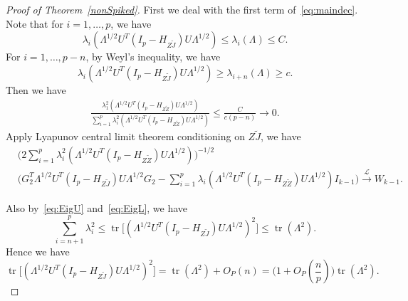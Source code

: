 \documentclass[review]{elsarticle}
\DeclareMathOperator{\mytr}{tr}
\theoremstyle{plain}
\theoremstyle{definition}
\theoremstyle{remark}
\begin{document}
\begin{proof}[\textrm{Proof of Theorem~\ref{nonSpiked}}]
    First we deal with the first term of~\eqref{eq:maindec}.
    Note that for $i=1,\ldots, p$, we have 
    \begin{equation}\label{eq:EigU}
    \lambda_i (\Lambda^{1/2}U^T (I_p-H_{Z\tilde{J}})U\Lambda^{1/2})\leq
    \lambda_i (\Lambda)\leq
    C.
    \end{equation}
    For $i=1,\ldots, p-n$, by Weyl's inequality, we have
    \begin{equation}\label{eq:EigL}
    \lambda_i (\Lambda^{1/2}U^T (I_p-H_{Z\tilde{J}})U\Lambda^{1/2})\geq
    \lambda_{i+n} (\Lambda)
    \geq c.
    \end{equation}
Then we have
    $$
    \begin{aligned}
    \frac{\lambda_1^2(\Lambda^{1/2}U^T(I_p-H_{Z\tilde{Z}})U\Lambda^{1/2})}{\sum_{i=1}^p \lambda_i^2(\Lambda^{1/2}U^T(I_p-H_{Z\tilde{Z}})U\Lambda^{1/2})}
    \leq
        \frac{C}{c(p-n)}\to 0.
    \end{aligned}
    $$
    Apply Lyapunov central limit theorem conditioning on $Z\tilde{J}$, we have
    $$
    \begin{aligned}
        &\Big( 2\sum_{i=1}^p \lambda_i^2(\Lambda^{1/2}U^T(I_p-H_{Z\tilde{Z}})U\Lambda^{1/2})\Big)^{-1/2}\\
        &{\Big( G_2^T \Lambda^{1/2}U^T (I_p-H_{Z\tilde{J}})U\Lambda^{1/2}G_2-\sum_{i=1}^p \lambda_i(\Lambda^{1/2}U^T(I_p-H_{Z\tilde{Z}})U\Lambda^{1/2})I_{k-1}\Big)}
    \xrightarrow{\mathcal{L}} W_{k-1}.
    \end{aligned}
    $$

    Also by~\eqref{eq:EigU} and~\eqref{eq:EigL}, we have
    $$
    \sum_{i=n+1}^p \lambda_i^2
    \leq
    \mytr\big[(\Lambda^{1/2}U^T (I_p-H_{Z\tilde{J}})U\Lambda^{1/2})^2\big]\leq
    \mytr(\Lambda^2).
    $$ 
    Hence we have
    $$
    \mytr\big[(\Lambda^{1/2}U^T (I_p-H_{Z\tilde{J}})U\Lambda^{1/2})^2\big]
    =
    \mytr(\Lambda^2)+O_P(n)
    =
    \big(1+O_P(\frac{n}{p})\big)\mytr(\Lambda^2).
    $$ 


\end{proof}
\end{document}
